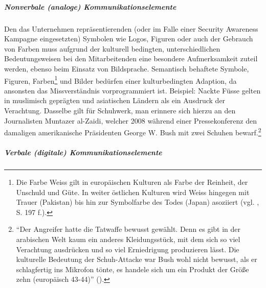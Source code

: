 \documentclass[../../main.tex]{subfiles}
\begin{document}
\subparagraph*{Nonverbale (analoge) Kommunikationselemente}\mbox{}

\begin{sloppypar}
Den das Unternehmen repräsentierenden (oder im Falle einer Security Awareness Kampagne eingesetzten) Symbolen wie Logos, Figuren oder auch der Gebrauch von Farben muss aufgrund der kulturell bedingten, unterschiedlichen Bedeutungsweisen bei den Mitarbeitenden eine besondere Aufmerksamkeit zuteil werden, ebenso beim Einsatz von Bildsprache. Semantisch behaftete Symbole, Figuren, Farben\footnote{Die Farbe Weiss gilt in europäischen Kulturen als Farbe der Reinheit, der Unschuld und Güte. In weiter östlichen Kulturen wird Weiss hingegen mit Trauer (Pakistan) bis hin zur Symbolfarbe des Todes (Japan) asoziiert (vgl. \citeauthor{helisch_security_2009} \citeyear{helisch_security_2009}, S. 197 f.).  } und Bilder bedürfen einer kulturbedingten Adaption, da ansonsten das Missverständnis vorprogrammiert ist. Beispiel: Nackte Füsse gelten in muslimisch geprägten und asiatischen Ländern als ein Ausdruck der Verachtung. Dasselbe gilt für Schuhwerk, man erinnere sich hierzu an den Journalisten Muntazer al-Zaidi, welcher 2008 während einer Pressekonferenz den damaligen amerikanische Präsidenten George W. Bush mit zwei Schuhen bewarf.\footnote{"`Der Angreifer hatte die Tatwaffe bewusst gewählt. Denn es gibt in der arabischen Welt kaum ein anderes Kleidungsstück, mit dem sich so viel Verachtung ausdrücken und so viel Erniedrigung produzieren lässt. Die kulturelle Bedeutung der Schuh-Attacke war Bush wohl nicht bewusst, als er schlagfertig ins Mikrofon tönte, es handele sich um ein Produkt der Größe zehn (europäisch 43-44)"' (\cite{kornelius_bush_2010}).  }

\end{sloppypar}

\subparagraph*{Verbale (digitale) Kommunikationselemente}\mbox{}
\end{document}
